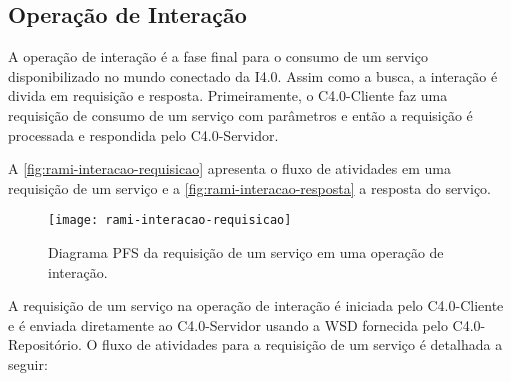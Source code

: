 \subsection{Operação de Interação}

	A operação de interação é a fase final para o consumo de um serviço disponibilizado no mundo conectado da I4.0. Assim como a busca, a interação é divida em requisição e resposta. Primeiramente, o C4.0-Cliente faz uma requisição de consumo de um serviço com parâmetros e então a requisição é processada e respondida pelo C4.0-Servidor.
	
	 A \autoref{fig:rami-interacao-requisicao} apresenta o fluxo de atividades em uma requisição de um serviço e a \autoref{fig:rami-interacao-resposta} a resposta do serviço.
	
	\begin{figure}[htb]
		\centering
		\caption{Diagrama PFS da requisição de um serviço em uma operação de interação.}
		\label{fig:rami-interacao-requisicao}
		\texttt{[image: rami-interacao-requisicao]}
	\end{figure}

	A requisição de um serviço na operação de interação é iniciada pelo C4.0-Cliente e é enviada diretamente ao C4.0-Servidor usando a WSD fornecida pelo C4.0-Repositório. O fluxo de atividades para a requisição de um serviço é detalhada a seguir:
	
